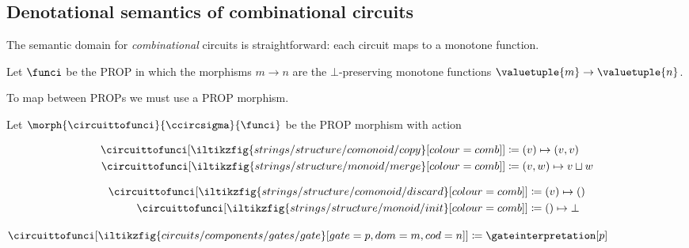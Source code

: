 \documentclass{lmcs}
\begin{document}
\subsection{Denotational semantics of combinational circuits}

The semantic domain for \emph{combinational} circuits is straightforward: each
circuit maps to a monotone function.

\begin{defi}
    Let \(\funci\) be the PROP in which the morphisms
    \(m \to n\) are the \(\bot\)-preserving monotone
    functions \(\valuetuple{m} \to \valuetuple{n}\).
\end{defi}

To map between PROPs we must use a PROP morphism.

\begin{defi}
    Let \(\morph{\circuittofunci}{\ccircsigma}{\funci}\) be the PROP morphism
    with action%
    \vspace{-\abovedisplayskip}
    \begin{center}
        \begin{minipage}{0.32\textwidth}
            \centering
            \begin{align*}
                \circuittofunci[
                    \iltikzfig{strings/structure/comonoid/copy}[colour=comb]
                ]
                 & \coloneqq
                (v) \mapsto (v, v)
                \\
                \circuittofunci[
                    \iltikzfig{strings/structure/monoid/merge}[colour=comb]
                ]
                 & \coloneqq
                (v, w) \mapsto v \sqcup w
            \end{align*}
        \end{minipage}
        \quad
        \begin{minipage}{0.25\textwidth}
            \centering
            \begin{align*}
                \circuittofunci[
                    \iltikzfig{strings/structure/comonoid/discard}[colour=comb]
                ]
                 & \coloneqq
                (v) \mapsto ()
                \\
                \circuittofunci[
                    \iltikzfig{strings/structure/monoid/init}[colour=comb]
                ]
                 & \coloneqq
                () \mapsto \bot
            \end{align*}
        \end{minipage}
        \quad
        \begin{minipage}{0.25\textwidth}
            \centering
            \vspace{1.5em}
            \(\circuittofunci[
                \iltikzfig{circuits/components/gates/gate}[gate=p,dom=m,cod=n]
            ]
            \coloneqq
            \gateinterpretation[p]
            \)
        \end{minipage}
    \end{center}
\end{defi}
\end{document}
